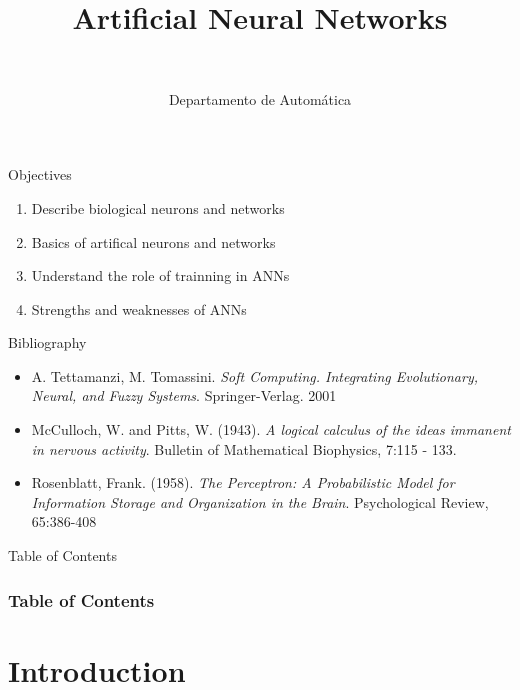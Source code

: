 \documentclass[10pt,compress]{beamer} %
\title[Aritificial Neural Networks]{Artificial Neural Networks}
\author{\asignatura\\\carrera}
\institute{}
\date{Departamento de Automática}
\begin{document}
{\titlepageBlue
    \begin{frame}
        \titlepage
    \end{frame}
}

\institute{\asignatura}

\begin{frame}[plain]{}
   \begin{block}{Objectives}
      \begin{enumerate}
         \item Describe biological neurons and networks
         \item Basics of artifical neurons and networks
         \item Understand the role of trainning in ANNs
         \item Strengths and weaknesses of ANNs
      \end{enumerate} 
   \end{block}

   \begin{block}{Bibliography}
	\begin{itemize}
        \item A. Tettamanzi, M. Tomassini. \textit{Soft Computing. Integrating Evolutionary, Neural, and Fuzzy Systems}. Springer-Verlag. 2001
	    \item McCulloch, W. and Pitts, W. (1943). \textit{A logical calculus of the ideas immanent in nervous activity}. Bulletin of Mathematical Biophysics, 7:115 - 133. 
	    \item Rosenblatt, Frank.  (1958). \textit{The Perceptron: A Probabilistic Model for Information Storage and Organization in the Brain}. Psychological Review, 65:386-408
	\end{itemize}
   \end{block}
\end{frame}

{
\begin{frame}[shrink]{Table of Contents}
 \frametitle{Table of Contents}
 \tableofcontents
\end{frame}
}

\section{Introduction}
\end{document}

